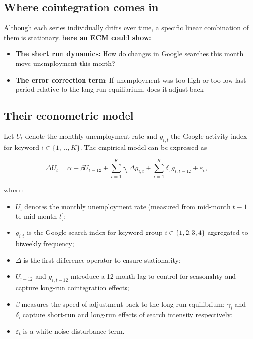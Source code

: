 \documentclass{article}
\begin{document}
\subsection{Where cointegration comes in}
Although each series individually drifts over time, a specific linear combination of them is stationary.
\textbf{here an ECM could show:} 
\begin{itemize}
    \item \textbf{The short run dynamics:} How do changes in Google searches this month move unemployment this month?
    \item \textbf{The error correction term}: If unemployment was too high or too low last period relative to the long-run equilibrium, does it adjust back
\end{itemize}



\subsection{Their econometric model}

Let $U_t$ denote the monthly unemployment rate and $g_{i,t}$ the Google activity index 
for keyword $i \in \{1, \dots, K\}$.
The empirical model can be expressed as

\begin{equation}
    \Delta U_t = \alpha 
    + \beta U_{t-12}
    + \sum_{i=1}^{K} \gamma_i \, \Delta g_{i,t}
    + \sum_{i=1}^{K} \delta_i \, g_{i,t-12}
    + \varepsilon_t ,
    \label{eq:az-ecm}
\end{equation}

where:
\begin{itemize}
    \item $U_t$ denotes the monthly unemployment rate 
    (measured from mid-month $t-1$ to mid-month $t$);
    \item $g_{i,t}$ is the Google search index for keyword group 
    $i \in \{1,2,3,4\}$ aggregated to biweekly frequency;
    \item $\Delta$ is the first-difference operator to ensure stationarity;
    \item $U_{t-12}$ and $g_{i,t-12}$ introduce a 12-month lag to 
    control for seasonality and capture long-run cointegration effects;
    \item $\beta$ measures the speed of adjustment back to the 
    long-run equilibrium; $\gamma_i$ and $\delta_i$ capture short-run 
    and long-run effects of search intensity respectively;
    \item $\varepsilon_t$ is a white-noise disturbance term.
\end{itemize}
\end{document}
